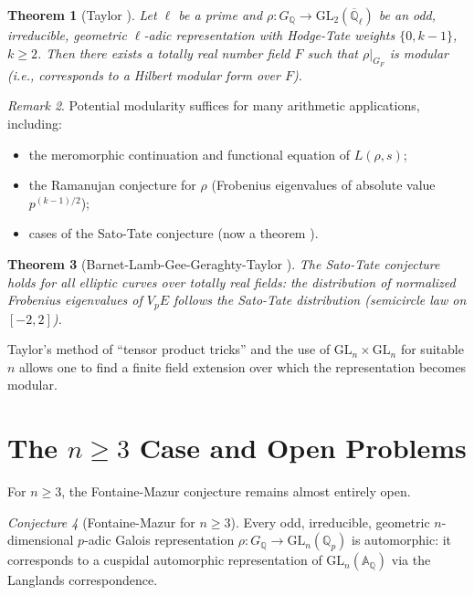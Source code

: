 \documentclass[12pt,a4paper]{amsart}
\newtheorem{theorem}{Theorem}[section]
\theoremstyle{definition}
\theoremstyle{remark}
\newtheorem{remark}[theorem]{Remark}
\newtheorem{conjecture}[theorem]{Conjecture}
\newcommand{\GL}{\mathrm{GL}}
\newcommand{\Qp}{\mathbb{Q}_p}
\newcommand{\GQ}{G_{\mathbb{Q}}}
\newcommand{\Q}{\mathbb{Q}}
\begin{document}
\begin{theorem}[Taylor \cite{Taylor2002}]\label{thm:taylor}
  Let $\ell$ be a prime and $\rho\colon \GQ \to \GL_2(\overline{\Q}_\ell)$ be an odd,
  irreducible, geometric $\ell$-adic representation with Hodge-Tate weights $\{0, k-1\}$,
  $k \geq 2$. Then there exists a totally real number field $F$ such that $\rho|_{G_F}$
  is modular (i.e., corresponds to a Hilbert modular form over $F$).
\end{theorem}

\begin{remark}
  Potential modularity suffices for many arithmetic applications, including:
  \begin{itemize}
    \item the meromorphic continuation and functional equation of $L(\rho, s)$;
    \item the Ramanujan conjecture for $\rho$ (Frobenius eigenvalues of absolute value
      $p^{(k-1)/2}$);
    \item cases of the Sato-Tate conjecture (now a theorem \cite{BGHT2011}).
  \end{itemize}
\end{remark}

\begin{theorem}[Barnet-Lamb-Gee-Geraghty-Taylor \cite{BGGT2014}]
  The Sato-Tate conjecture holds for all elliptic curves over totally real fields: the
  distribution of normalized Frobenius eigenvalues of $V_p E$ follows the Sato-Tate
  distribution (semicircle law on $[-2,2]$).
\end{theorem}

Taylor's method of ``tensor product tricks'' and the use of $\GL_n \times \GL_n$ for
suitable $n$ allows one to find a finite field extension over which the representation
becomes modular.

\section{The $n \geq 3$ Case and Open Problems}\label{sec:openproblems}

For $n \geq 3$, the Fontaine-Mazur conjecture remains almost entirely open.

\begin{conjecture}[Fontaine-Mazur for $n \geq 3$]\label{conj:FMn3}
  Every odd, irreducible, geometric $n$-dimensional $p$-adic Galois representation
  $\rho\colon \GQ \to \GL_n(\Qp)$ is automorphic: it corresponds to a cuspidal
  automorphic representation of $\GL_n(\mathbb{A}_\Q)$ via the Langlands correspondence.
\end{conjecture}
\end{document}
